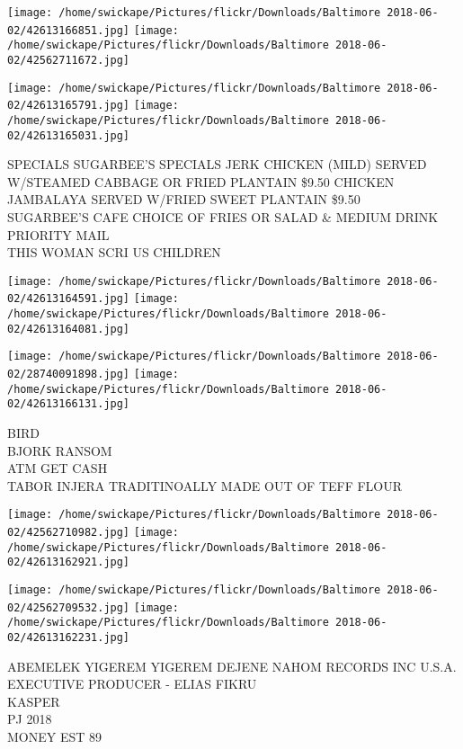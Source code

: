 \documentclass[10pt,letterpaper]{article}
\begin{document}
\texttt{[image: /home/swickape/Pictures/flickr/Downloads/Baltimore 2018-06-02/42613166851.jpg]}
\texttt{[image: /home/swickape/Pictures/flickr/Downloads/Baltimore 2018-06-02/42562711672.jpg]}

\texttt{[image: /home/swickape/Pictures/flickr/Downloads/Baltimore 2018-06-02/42613165791.jpg]}
\texttt{[image: /home/swickape/Pictures/flickr/Downloads/Baltimore 2018-06-02/42613165031.jpg]}

SPECIALS SUGARBEE'S SPECIALS JERK CHICKEN (MILD) SERVED W/STEAMED CABBAGE OR FRIED PLANTAIN \$9.50 CHICKEN JAMBALAYA SERVED W/FRIED SWEET PLANTAIN \$9.50\\
SUGARBEE'S CAFE CHOICE OF FRIES OR SALAD \& MEDIUM DRINK\\
PRIORITY MAIL\\
THIS WOMAN SCRI US CHILDREN\\
\pagebreak

\texttt{[image: /home/swickape/Pictures/flickr/Downloads/Baltimore 2018-06-02/42613164591.jpg]}
\texttt{[image: /home/swickape/Pictures/flickr/Downloads/Baltimore 2018-06-02/42613164081.jpg]}

\texttt{[image: /home/swickape/Pictures/flickr/Downloads/Baltimore 2018-06-02/28740091898.jpg]}
\texttt{[image: /home/swickape/Pictures/flickr/Downloads/Baltimore 2018-06-02/42613166131.jpg]}

BIRD\\
BJORK RANSOM\\
ATM GET CASH\\
TABOR INJERA TRADITINOALLY MADE OUT OF TEFF FLOUR\\
\pagebreak

\texttt{[image: /home/swickape/Pictures/flickr/Downloads/Baltimore 2018-06-02/42562710982.jpg]}
\texttt{[image: /home/swickape/Pictures/flickr/Downloads/Baltimore 2018-06-02/42613162921.jpg]}

\texttt{[image: /home/swickape/Pictures/flickr/Downloads/Baltimore 2018-06-02/42562709532.jpg]}
\texttt{[image: /home/swickape/Pictures/flickr/Downloads/Baltimore 2018-06-02/42613162231.jpg]}

ABEMELEK YIGEREM YIGEREM DEJENE NAHOM RECORDS INC U.S.A. EXECUTIVE PRODUCER {-} ELIAS FIKRU\\
KASPER\\
PJ 2018\\
MONEY EST 89\\
\pagebreak
\end{document}
